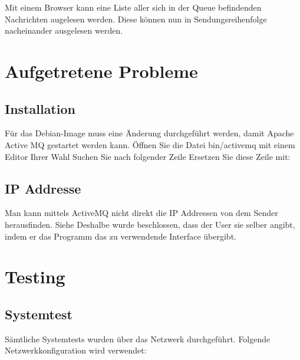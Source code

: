 \documentclass[11pt, a4paper]{article}
\begin{document}
Mit einem Browser kann eine Liste aller sich in der Queue befindenden Nachrichten augelesen werden. Diese können nun in Sendungsreihenfolge nacheinander
ausgelesen werden.

\newpage

\section{Aufgetretene Probleme}
\subsection{Installation}
Für das Debian-Image muss eine Änderung durchgeführt werden, damit Apache Active MQ gestartet werden kann.
Öffnen Sie die Datei bin/activemq mit einem Editor Ihrer Wahl 
Suchen Sie nach folgender Zeile
Ersetzen Sie diese Zeile mit:
\subsection{IP Addresse}
Man kann mittels ActiveMQ nicht direkt die IP Addressen von dem Sender herausfinden. Siehe 
Deshalbe wurde beschlossen, dass der User sie selber angibt, indem er das Programm das zu verwendende Interface übergibt.

\newpage

\section{Testing}
\subsection{Systemtest}
Sämtliche Systemtests wurden über das Netzwerk durchgeführt.
Folgende Netzwerkkonfiguration wird verwendet:
\end{document}

